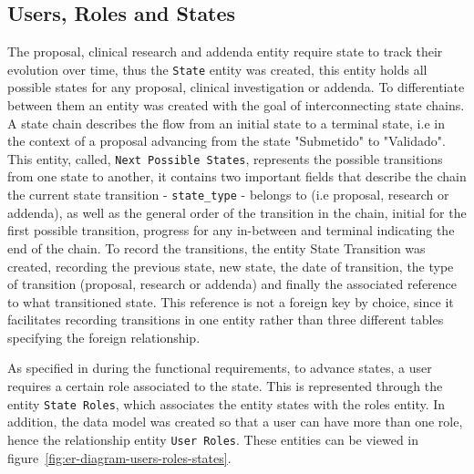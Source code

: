 \subsection{Users, Roles and States}
The proposal, clinical research and addenda entity require state to track their evolution over time, thus the \texttt{State} entity was created, this entity holds all possible states for any proposal, clinical investigation or addenda. To differentiate between them an entity was created with the goal of interconnecting state chains. A state chain describes the flow from an initial state to a terminal state, i.e in the context of a proposal advancing from the state "Submetido" to "Validado". This entity, called, \texttt{Next Possible States}, represents the possible transitions from one state to another, it contains two important fields that describe the chain the current state transition - \texttt{state\_type} - belongs to (i.e proposal, research or addenda), as well as the general order of the transition in the chain, initial for the first possible transition, progress for any in-between and terminal indicating the end of the chain.
To record the transitions, the entity State Transition was created, recording the previous state, new state, the date of transition, the type of transition (proposal, research or addenda) and finally the associated reference to what transitioned state. This reference is not a foreign key by choice, since it facilitates recording transitions in one entity rather than three different tables specifying the foreign relationship. 

As specified in during the functional requirements, to advance states, a user requires a certain role associated to the state. This is represented through the entity \texttt{State Roles}, which associates the entity states with the roles entity. In addition, the data model was created so that a user can have more than one role, hence the relationship entity \texttt{User Roles}.
These entities can be viewed in figure~\ref{fig:er-diagram-users-roles-states}.


